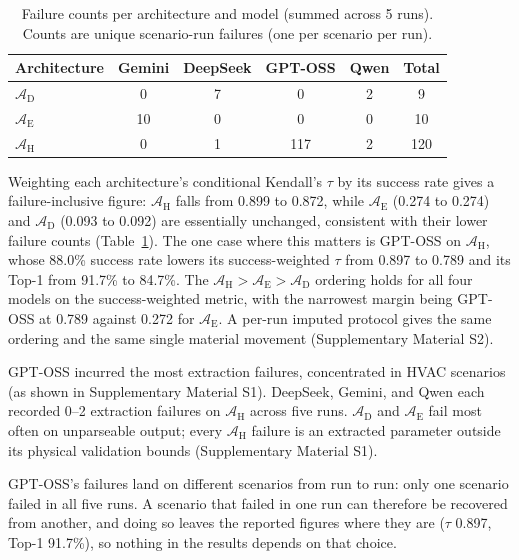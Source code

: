 \documentclass[final,3p,times]{elsarticle}
\begin{document}
\begin{table}[htbp]
\centering
\begin{threeparttable}
\small\centering
\begin{tabular}{lccccc}
\toprule
Architecture & Gemini & DeepSeek & GPT-OSS & Qwen & Total \\
\midrule
$\mathcal{A}_{\text{D}}$ & 0 & 7 & 0 & 2 & 9 \\
$\mathcal{A}_{\text{E}}$ & 10 & 0 & 0 & 0 & 10 \\
$\mathcal{A}_{\text{H}}$ & 0 & 1 & 117 & 2 & 120 \\
\bottomrule
\end{tabular}
\caption{Failure counts per architecture and model (summed across 5 runs). Counts are unique scenario-run failures (one per scenario per run).}
\label{tab:failure_arch_model}
\end{threeparttable}
\end{table}

Weighting each architecture's conditional Kendall's $\tau$ by its success rate gives a failure-inclusive figure: $\mathcal{A}_{\text{H}}$ falls from 0.899 to 0.872, while $\mathcal{A}_{\text{E}}$ (0.274 to 0.274) and $\mathcal{A}_{\text{D}}$ (0.093 to 0.092) are essentially unchanged, consistent with their lower failure counts (Table~\ref{tab:failure_arch_model}). The one case where this matters is GPT-OSS on $\mathcal{A}_{\text{H}}$, whose 88.0\% success rate lowers its success-weighted $\tau$ from 0.897 to 0.789 and its Top-1 from 91.7\% to 84.7\%. The $\mathcal{A}_{\text{H}} > \mathcal{A}_{\text{E}} > \mathcal{A}_{\text{D}}$ ordering holds for all four models on the success-weighted metric, with the narrowest margin being GPT-OSS at 0.789 against 0.272 for $\mathcal{A}_{\text{E}}$. A per-run imputed protocol gives the same ordering and the same single material movement (Supplementary Material S2). 

GPT-OSS incurred the most extraction failures, concentrated in HVAC scenarios (as shown in Supplementary Material S1). DeepSeek, Gemini, and Qwen each recorded 0--2 extraction failures on $\mathcal{A}_{\text{H}}$ across five runs. $\mathcal{A}_{\text{D}}$ and $\mathcal{A}_{\text{E}}$ fail most often on unparseable output; every $\mathcal{A}_{\text{H}}$ failure is an extracted parameter outside its physical validation bounds (Supplementary Material S1).

GPT-OSS's failures land on different scenarios from run to run: only one scenario failed in all five runs. A scenario that failed in one run can therefore be recovered from another, and doing so leaves the reported figures where they are ($\tau$ 0.897, Top-1 91.7\%), so nothing in the results depends on that choice.
\end{document}
